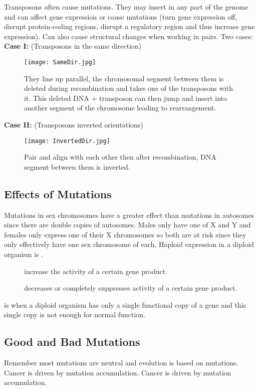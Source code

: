 \documentclass[../Bio_chemistryReview.tex]{subfiles}
\begin{document}
Transposons often cause mutations. They may insert in any part of the genome and
can affect gene expression or cause mutations (turn gene expression off, disrupt
protein-coding regions, disrupt a regulatory region and thus increase gene
expression). Can also cause structural changes when working in pairs. Two
cases:\\
\textbf{Case I:} (Transposons in the same direction)\\
\begin{figure}[H]
  \centering
  \texttt{[image: SameDir.jpg]}
  \caption{They line up parallel, the chromosomal segment between them is deleted during
recombination and takes one of the transposons with it. This deleted DNA +
transposon can then jump and insert into another segment of the chromosome
leading to rearrangement.}
\end{figure}

\newpage
\noindent\textbf{Case II:} (Transposons inverted orientations)\\
\begin{figure}[H]
  \centering
  \texttt{[image: InvertedDir.jpg]}
  \caption{Pair and align with each other then after recombination, DNA segment between
them is inverted.}
\end{figure}

\subsection{Effects of Mutations}
Mutations in sex chromosomes have a greater effect than mutations in autosomes
since there are double copies of autosomes. Males only have one of X and Y and
females only express one of their X chromosomes so both are at risk since they
only effectively have one sex chromosome of each. Haploid expression in a
diploid organism is .
\begin{description}
  \item[] increase the activity of a certain
    gene product.
  \item[] decreases or completely suppresses
    activity of a certain gene product.
\end{description}
 is when a diploid organism has only a single
functional copy of a gene and this single copy is not enough for normal
function.

\subsection{Good and Bad Mutations}
Remember most mutations are neutral and evolution is based on mutations. Cancer
is driven by mutation accumulation. Cancer is driven by mutation accumulation.
\end{document}
